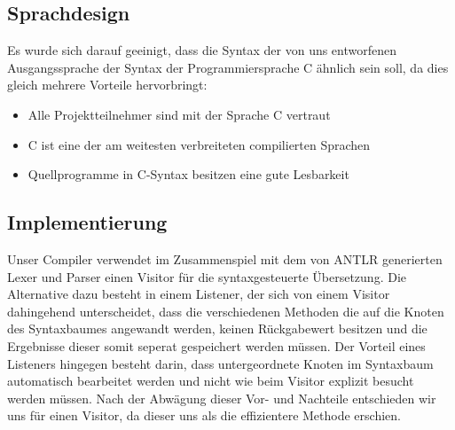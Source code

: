 \subsection{Sprachdesign}
Es wurde sich darauf geeinigt, dass die Syntax der von uns entworfenen Ausgangssprache der Syntax der Programmiersprache C ähnlich sein soll, da dies gleich mehrere Vorteile hervorbringt:
\begin{itemize}
\item Alle Projektteilnehmer sind mit der Sprache C vertraut
\item C ist eine der am weitesten verbreiteten compilierten Sprachen
\item Quellprogramme in C-Syntax besitzen eine gute Lesbarkeit
\end{itemize}

\subsection{Implementierung}
Unser Compiler verwendet im Zusammenspiel mit dem von ANTLR generierten Lexer und Parser einen Visitor für die syntaxgesteuerte Übersetzung. Die Alternative dazu besteht in einem Listener, der sich von einem Visitor dahingehend unterscheidet, dass die verschiedenen Methoden die auf die Knoten des Syntaxbaumes angewandt werden, keinen Rückgabewert besitzen und die Ergebnisse dieser somit seperat gespeichert werden müssen. Der Vorteil eines Listeners hingegen besteht darin, dass untergeordnete Knoten im Syntaxbaum automatisch bearbeitet werden und nicht wie beim Visitor explizit besucht werden müssen. Nach der Abwägung dieser Vor- und Nachteile entschieden wir uns für einen Visitor, da dieser uns als die effizientere Methode erschien.



